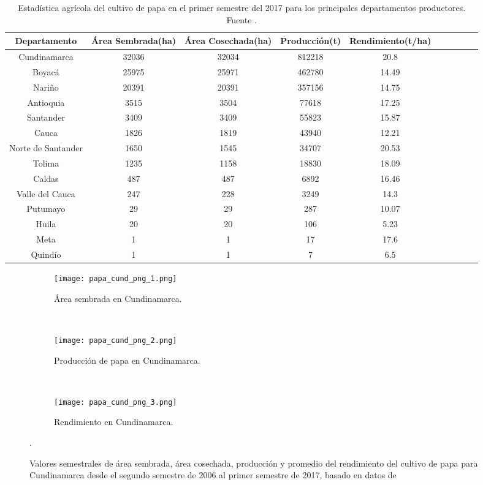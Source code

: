 \begin{table}[H] %
\begin{center}
	\caption{Estadística agrícola del cultivo de papa en el primer semestre del 2017 para los principales departamentos productores. Fuente \citep{madr2017}.}
    \label{table:1}
	\begin{tabular}{cccccccccc}
Departamento&Área Sembrada(ha)&Área Cosechada(ha)&Producción(t)&Rendimiento(t/ha)&\\
\hline
Cundinamarca&32036&32034&812218&20.8&\\
Boyacá&25975&25971&462780&14.49&\\
Nariño&20391&20391&357156&14.75&\\
Antioquia&3515&3504&77618&17.25&\\
Santander&3409&3409&55823&15.87&\\
Cauca&1826&1819&43940&12.21&\\
Norte de Santander&1650&1545&34707&20.53&\\
Tolima&1235&1158&18830&18.09&\\
Caldas&487&487&6892&16.46&\\
Valle del Cauca&247&228&3249&14.3&\\
Putumayo&29&29&287&10.07&\\
Huila&20&20&106&5.23&\\
Meta&1&1&17&17.6&\\
Quindío&1&1&7&6.5&\\
		\end{tabular}
		
\end{center}

\end{table}

\begin{figure}[H]
	\begin{center}
		\begin{subfigure}[normla]{0.65\textwidth}
		\caption{Área sembrada en Cundinamarca.}
		\texttt{[image: papa\_cund\_png\_1.png]}	
		\label{gra:papa_cund_1}	
		\end{subfigure}
		~
		\begin{subfigure}[normla]{0.65\textwidth}
		\caption{Producción de papa en Cundinamarca.}
		\texttt{[image: papa\_cund\_png\_2.png]}	
		\label{gra:papa_cund_2}	
		\end{subfigure}
		~
		\begin{subfigure}[normla]{0.65\textwidth}
		\caption{Rendimiento en Cundinamarca.}
		\texttt{[image: papa\_cund\_png\_3.png]}	
		\label{gra:papa_cund_3}	
		\end{subfigure}

	\end{center}
	
	\caption{Valores semestrales de área sembrada, área cosechada, producción y promedio del rendimiento del cultivo de papa para Cundinamarca desde el segundo semestre de 2006 al primer semestre de 2017, basado en datos de \citet{madr2017}}.
	 \label{gra:papa_cund}
\end{figure}


